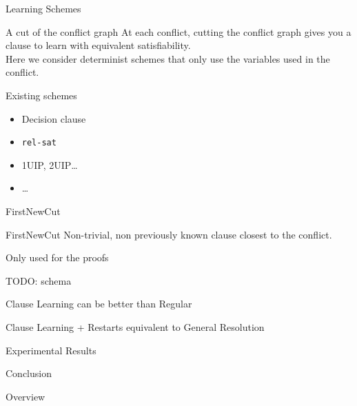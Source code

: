\documentclass[page number]{beamer}
\begin{document}
\begin{frame}{Learning Schemes}
  \begin{block}{A cut of the conflict graph}
    At each conflict, cutting the conflict graph gives you a clause to learn with equivalent satisfiability.\\
    Here we consider determinist schemes that only use the variables used in the conflict.
  \end{block}
  \vfill
  \begin{block}{Existing schemes}
    \begin{itemize}
    \item Decision clause
    \item \texttt{rel-sat}
    \item 1UIP, 2UIP\dots
    \item \dots
    \end{itemize}
  \end{block}
  
\end{frame}

\begin{frame}{FirstNewCut}
  \begin{exampleblock}{FirstNewCut}
    Non-trivial, non previously known clause closest to the conflict.
  \end{exampleblock}
  \vfill
  \begin{alertblock}{Only used for the proofs}
  \end{alertblock}
  \vfill
  TODO: schema
\end{frame}

\begin{frame}{Clause Learning can be better than Regular}
\end{frame}

\begin{frame}{Clause Learning + Restarts equivalent to General Resolution}
\end{frame}

\begin{frame}{Experimental Results}
\end{frame}

\begin{frame}{Conclusion}
\end{frame}

\begin{frame}{Overview}
\end{frame}
\end{document}
